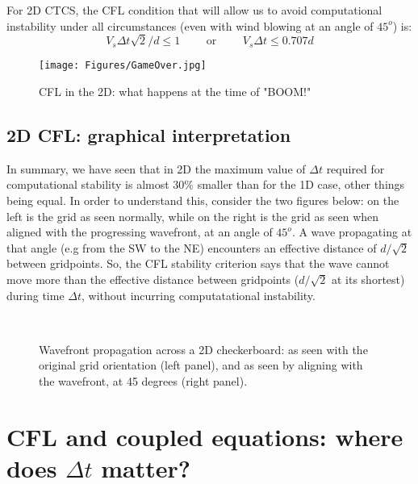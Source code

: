 \begin{theorem}
	For 2D CTCS, the CFL condition that will allow us to avoid computational instability under all circumstances (even with wind blowing at an angle of $45^o$) is: 
	\begin{equation}
		V_s \Delta t \sqrt{2} / d \leq 1 \textrm{   ~~~~~      or     ~~~~~  } V_s \Delta t \leq 0.707 d 
	\end{equation}
\end{theorem}


\begin{figure}[h!]
	\begin{center}
		\texttt{[image: Figures/GameOver.jpg]}
		\caption{CFL in the 2D: what happens at the time of "BOOM!"}
	\end{center}
\end{figure}	

	
\subsection{2D CFL: graphical interpretation}

	In summary, we have seen that in 2D the maximum value of $\Delta t$ required for computational stability is almost 30\% smaller than for the 1D case, other things being equal. In order to understand this, consider the two figures below: on the left is the grid as seen normally, while on the right is the grid as seen when aligned with the progressing wavefront, at an angle of $45^o$.
	A wave propagating at that angle (e.g from the SW to the NE) encounters an effective distance of $d/\sqrt{2}$ between gridpoints. So, the CFL stability criterion says that the wave cannot move more than the effective distance between gridpoints ($d/\sqrt{2}$ at its shortest) during time $\Delta t$, without incurring computatational instability.
	
	\begin{figure}[h!]
	\mbox{
	            }
			\caption{Wavefront propagation across a 2D checkerboard: as seen with the original grid orientation (left panel), and as seen by aligning with the wavefront, at 45 degrees (right panel).}
	\end{figure}
	

\section{CFL and coupled equations: where does $\Delta t$ matter?}

